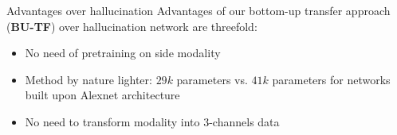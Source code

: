 \begin{frame}{Advantages over hallucination}
	Advantages of our bottom-up transfer approach (\textbf{BU-TF}) over hallucination network are threefold: 
	\begin{itemize}
		\item<2-> No need of pretraining on side modality
		\item<3-> Method by nature lighter: $29k$ parameters vs. $41k$ parameters for networks built upon Alexnet architecture
		\item<4> No need to transform modality into 3-channels data
	\end{itemize}
	

\end{frame}